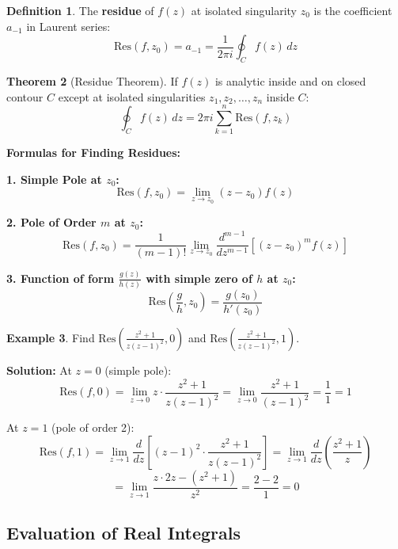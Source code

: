 \documentclass[12pt,a4paper]{article}
\theoremstyle{definition}
\newtheorem{theorem}{Theorem}[section]
\newtheorem{definition}[theorem]{Definition}
\newtheorem{example}[theorem]{Example}
\begin{document}
\begin{definition}
The \textbf{residue} of $f(z)$ at isolated singularity $z_0$ is the coefficient $a_{-1}$ in Laurent series:
\[
\text{Res}(f, z_0) = a_{-1} = \frac{1}{2\pi i}\oint_C f(z)\,dz
\]
\end{definition}

\begin{theorem}[Residue Theorem]
If $f(z)$ is analytic inside and on closed contour $C$ except at isolated singularities $z_1, z_2, \ldots, z_n$ inside $C$:
\[
\oint_C f(z)\,dz = 2\pi i \sum_{k=1}^{n} \text{Res}(f, z_k)
\]
\end{theorem}

\begin{importantbox}
\textbf{Formulas for Finding Residues:}

\textbf{1. Simple Pole at $z_0$:}
\[
\text{Res}(f, z_0) = \lim_{z \to z_0} (z - z_0)f(z)
\]

\textbf{2. Pole of Order $m$ at $z_0$:}
\[
\text{Res}(f, z_0) = \frac{1}{(m-1)!}\lim_{z \to z_0} \frac{d^{m-1}}{dz^{m-1}}\left[(z - z_0)^m f(z)\right]
\]

\textbf{3. Function of form $\frac{g(z)}{h(z)}$ with simple zero of $h$ at $z_0$:}
\[
\text{Res}\left(\frac{g}{h}, z_0\right) = \frac{g(z_0)}{h'(z_0)}
\]
\end{importantbox}

\begin{example}
Find $\text{Res}\left(\frac{z^2 + 1}{z(z - 1)^2}, 0\right)$ and $\text{Res}\left(\frac{z^2 + 1}{z(z - 1)^2}, 1\right)$.

\textbf{Solution:}
At $z = 0$ (simple pole):
\[
\text{Res}(f, 0) = \lim_{z \to 0} z \cdot \frac{z^2 + 1}{z(z - 1)^2} = \lim_{z \to 0} \frac{z^2 + 1}{(z - 1)^2} = \frac{1}{1} = 1
\]

At $z = 1$ (pole of order 2):
\[
\text{Res}(f, 1) = \lim_{z \to 1} \frac{d}{dz}\left[(z-1)^2 \cdot \frac{z^2 + 1}{z(z - 1)^2}\right] = \lim_{z \to 1} \frac{d}{dz}\left(\frac{z^2 + 1}{z}\right)
\]
\[
= \lim_{z \to 1} \frac{z \cdot 2z - (z^2 + 1)}{z^2} = \frac{2 - 2}{1} = 0
\]
\end{example}

\subsection{Evaluation of Real Integrals}
\end{document}
